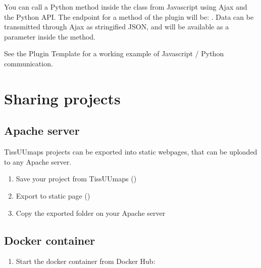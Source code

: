 \documentclass[letterpaper,10pt,english,openany,oneside]{sphinxmanual}
\begin{document}
\sphinxAtStartPar
You can call a Python method inside the  class from Javascript using Ajax and the Python API. The endpoint for a method  of the plugin  will be: . Data can be transmitted through Ajax as stringified JSON, and will be available as a parameter inside the method.

\sphinxAtStartPar
See the Plugin Template for a working example of Javascript / Python communication.

\sphinxstepscope


\chapter{Sharing projects}
\label{\detokenize{docs/sharing/index:sharing-projects}}\label{\detokenize{docs/sharing/index::doc}}
\sphinxstepscope


\section{Apache server}
\label{\detokenize{docs/sharing/apache:apache-server}}\label{\detokenize{docs/sharing/apache::doc}}
\sphinxAtStartPar
TissUUmaps projects can be exported into static webpages, that can be uploaded to any Apache server.
\begin{enumerate}
%
\item {} 
\sphinxAtStartPar
Save your project from TissUUmaps ()

\item {} 
\sphinxAtStartPar
Export to static page ()

\item {} 
\sphinxAtStartPar
Copy the exported folder on your Apache server

\end{enumerate}

\sphinxstepscope


\section{Docker container}
\label{\detokenize{docs/sharing/docker:docker-container}}\label{\detokenize{docs/sharing/docker::doc}}\begin{enumerate}
%
\item {} 
\sphinxAtStartPar
Start the docker container  from Docker Hub:

\end{enumerate}
\end{document}
